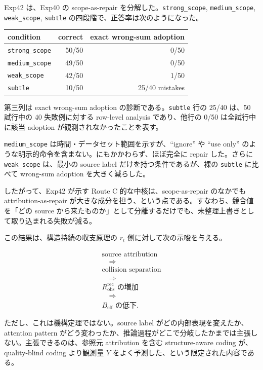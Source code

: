 \documentclass[12pt,a4paper]{article}
\begin{document}
Exp42 は、Exp40 の scope-as-repair を分解した。\texttt{strong\_scope}, \texttt{medium\_scope}, \texttt{weak\_scope}, \texttt{subtle} の四段階で、正答率は次のようになった。

{\def\LTcaptype{table} %
\begin{longtable}[]{@{}lrr@{}}
\toprule\noalign{}
condition & correct & exact wrong-sum adoption \\
\midrule\noalign{}
\endhead
\bottomrule\noalign{}
\endlastfoot
\texttt{strong\_scope} & 50/50 & 0/50 \\
\texttt{medium\_scope} & 49/50 & 0/50 \\
\texttt{weak\_scope} & 42/50 & 1/50 \\
\texttt{subtle} & 10/50 & 25/40 mistakes \\
\end{longtable}
}

第三列は exact wrong-sum adoption の診断である。\texttt{subtle} 行の 25/40 は、50 試行中の 40 失敗例に対する row-level analysis であり、他行の 0/50 は全試行中に該当 adoption が観測されなかったことを表す。

\texttt{medium\_scope} は時間・データセット範囲を示すが、``ignore'' や ``use only'' のような明示的命令を含まない。にもかかわらず、ほぼ完全に repair した。さらに \texttt{weak\_scope} は、最小の source label だけを持つ条件であるが、裸の \texttt{subtle} に比べて wrong-sum adoption を大きく減らした。

したがって、Exp42 が示す Route C 的な中核は、scope-as-repair のなかでも attribution-as-repair が大きな成分を担う、という点である。すなわち、競合値を「どの source から来たものか」として分離するだけでも、未整理上書きとして取り込まれる失敗が減る。

この結果は、構造持続の収支原理の \(r_{t}\) 側に対して次の示唆を与える。

\[
\begin{aligned}
\text{source attribution} \\
\quad\Rightarrow\quad \\
\text{collision separation} \\
\quad\Rightarrow\quad \\
R_{\mathrm{obs}}^{\mathrm{rec}}\text{ の増加} \\
\quad\Rightarrow\quad \\
B_{\mathrm{eff}}\text{ の低下}.
\end{aligned}
\]

ただし、これは機構定理ではない。source label がどの内部表現を変えたか、attention pattern がどう変わったか、推論過程がどこで分岐したかまでは主張しない。主張できるのは、参照元 attribution を含む structure-aware coding が、quality-blind coding より観測量 \(Y\) をよく予測した、という限定された内容である。
\end{document}
